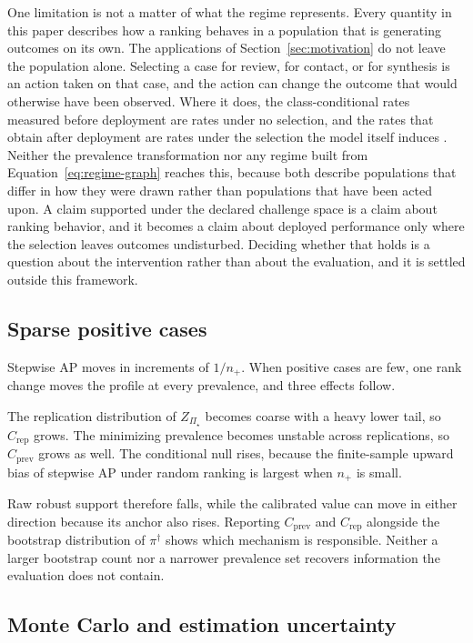 \documentclass[11pt]{article}
\newcommand{\PSet}{\Pi_\star}
\theoremstyle{remark}
\begin{document}
One limitation is not a matter of what the regime represents. Every quantity in this paper describes how a ranking behaves in a population that is generating outcomes on its own. The applications of Section~\ref{sec:motivation} do not leave the population alone. Selecting a case for review, for contact, or for synthesis is an action taken on that case, and the action can change the outcome that would otherwise have been observed. Where it does, the class-conditional rates measured before deployment are rates under no selection, and the rates that obtain after deployment are rates under the selection the model itself induces \cite{perdomo2020performative}. Neither the prevalence transformation nor any regime built from Equation~\eqref{eq:regime-graph} reaches this, because both describe populations that differ in how they were drawn rather than populations that have been acted upon. A claim supported under the declared challenge space is a claim about ranking behavior, and it becomes a claim about deployed performance only where the selection leaves outcomes undisturbed. Deciding whether that holds is a question about the intervention rather than about the evaluation, and it is settled outside this framework.

\subsection{Sparse positive cases}
\label{sec:sparse}

Stepwise AP moves in increments of $1/n_+$. When positive cases are few, one rank change moves the profile at every prevalence, and three effects follow.

The replication distribution of $Z_{\PSet}$ becomes coarse with a heavy lower tail, so $C_{\mathrm{rep}}$ grows. The minimizing prevalence becomes unstable across replications, so $C_{\mathrm{prev}}$ grows as well. The conditional null rises, because the finite-sample upward bias of stepwise AP under random ranking is largest when $n_+$ is small.

Raw robust support therefore falls, while the calibrated value can move in either direction because its anchor also rises. Reporting $C_{\mathrm{prev}}$ and $C_{\mathrm{rep}}$ alongside the bootstrap distribution of $\pi^\dagger$ shows which mechanism is responsible. Neither a larger bootstrap count nor a narrower prevalence set recovers information the evaluation does not contain.

\subsection{Monte Carlo and estimation uncertainty}
\end{document}
